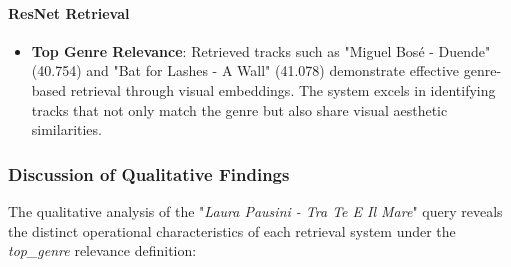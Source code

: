 \documentclass[sigconf]{acmart}
\begin{document}
\paragraph{ResNet Retrieval}

\begin{itemize}
    \item \textbf{Top Genre Relevance}: Retrieved tracks such as "Miguel Bosé - Duende" (40.754) and "Bat for Lashes - A Wall" (41.078) demonstrate effective genre-based retrieval through visual embeddings. The system excels in identifying tracks that not only match the genre but also share visual aesthetic similarities.
\end{itemize}

\subsubsection{Discussion of Qualitative Findings}
\label{subsubsec:discussion_qualitative_findings}

The qualitative analysis of the "\textit{Laura Pausini - Tra Te E Il Mare}" query reveals the distinct operational characteristics of each retrieval system under the \textit{top\_genre} relevance definition:
\end{document}
